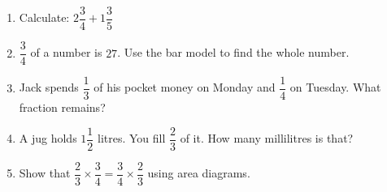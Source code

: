 \documentclass{beamer}
\newcommand{\ashow}[1]{\uncover<2->{\textcolor{red}{\small #1}}}
\begin{document}
\begin{frame}
\begin{columns}
\begin{enumerate}
  \item Calculate: $2\dfrac{3}{4} + 1\dfrac{3}{5}$ \ashow{$=4\dfrac{7}{20}$}

  \item $\dfrac{3}{4}$ of a number is $27$. Use the bar model to find the whole number. \ashow{$36$}

  \item Jack spends $\dfrac{1}{3}$ of his pocket money on Monday and $\dfrac{1}{4}$ on Tuesday. What fraction remains? \ashow{$\dfrac{5}{12}$}

  \item A jug holds $1\dfrac{1}{2}$ litres. You fill $\dfrac{2}{3}$ of it. How many millilitres is that? \ashow{$1000$ mL}

  \item Show that $\dfrac{2}{3} \times \dfrac{3}{4} = \dfrac{3}{4} \times \dfrac{2}{3}$ using area diagrams.


\end{enumerate}
\end{columns}
\end{frame}
\end{document}
